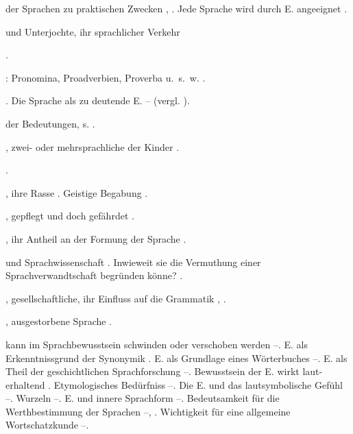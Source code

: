 \begin{register}
 der Sprachen zu praktischen Zwecken \pageref{sp.7}, \pageref{sp.16}.  Jede Sprache wird durch E. angeeignet \pageref{sp.61}.


 und Unterjochte, ihr sprachlicher Verkehr \pageref{sp.182}


 \pageref{sp.200}.

: Pronomina, Proadverbien, Proverba u.~s.~w. \pageref{sp.101}.

. Die Sprache als zu deutende E. \pageref{sp.84}–\pageref{sp.85} (vergl. ).

 der Bedeutungen, s. .


, zwei- oder mehrsprachliche der Kinder \pageref{sp.70}.

 \pageref{sp.426}.

, ihre Rasse \pageref{sp.147}. Geistige Begabung \pageref{sp.389}.

, gepflegt und doch gefährdet \pageref{sp.146}. 

, ihr Antheil an der Formung der Sprache \pageref{sp.95}.

 und Sprachwissenschaft \pageref{sp.14}. Inwieweit sie die Vermuthung einer Sprachverwandtschaft begründen könne? \pageref{sp.148}.

, gesellschaftliche, ihr Einfluss auf die Grammatik \pageref{sp.95}, \pageref{sp.246}.

, ausgestorbene Sprache \pageref{sp.146}.


 kann im Sprachbewusstsein schwinden oder verschoben werden \pageref{sp.60}–\pageref{sp.61}. E. als Erkenntnissgrund der Synonymik \pageref{sp.100}. E. als Grundlage eines Wörterbuches \pageref{sp.123}–\pageref{sp.124}. E. als Theil der geschichtlichen Sprachforschung \pageref{sp.179}–\pageref{sp.181}. Bewusstsein der E. wirkt laut-erhaltend \pageref{sp.203}. Etymologisches Bedürfniss \pageref{sp.214}–\pageref{sp.218}. Die E. und das lautsymbolische Gefühl \pageref{sp.218}–\pageref{sp.225}.  Wurzeln \pageref{sp.295}–\pageref{sp.297}. E. und innere Sprachform \pageref{sp.328}–\pageref{sp.334}\sed{, \pageref{sp.336}, \pageref{sp.344}}. Bedeutsamkeit für die Werthbestimmung der Sprachen \pageref{sp.395}–\pageref{sp.398}, \pageref{sp.437}. Wichtigkeit für eine allgemeine Wortschatzkunde \pageref{sp.482}–\pageref{sp.483}.


\end{register}
